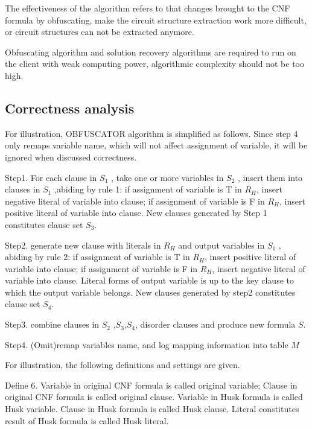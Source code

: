 \documentclass[runningheads,a4paper]{llncs}
\begin{document}
The effectiveness of the algorithm refers to that changes brought to the CNF formula by obfuscating, make the circuit structure extraction work more difficult, 
or circuit structures can not be extracted anymore. 

Obfuscating algorithm and solution recovery algorithms are required to run on the client with weak computing power, algorithmic complexity should not be too high.
\subsection{Correctness analysis}

For illustration, OBFUSCATOR algorithm is simplified as follows. Since step 4 only remaps variable name, which will not affect assignment of variable, 
it will be ignored when discussed correctness.

Step1. For each clause in $S_1$  , take one or more variables in $S_2$ , insert them into clauses in $S_1$ ,abiding by rule 1:
if assignment of variable is T in $R_H$, insert negative literal of variable into clause;
if assignment of variable is F in $R_H$, insert positive literal of variable into clause. 
New clauses generated by Step 1 constitutes clause set $S_3$.

Step2. generate new clause with literals in $R_H$ and output variables in $S_1$ , abiding by rule 2: 
if assignment of variable is T in $R_H$, insert positive literal of variable into clause;
if assignment of variable is F in $R_H$, insert negative literal of variable into clause.
Literal forms of output variable is up to the key clause to which the output variable belongs. 
New clauses generated by step2 constitutes clause set $S_4$.

Step3. combine clauses in $S_2$ ,$S_3$,$S_4$, disorder clauses and produce new formula $S$.

Step4. (Omit)remap variables name, and log mapping information into table $M$ 

For illustration, the following definitions and settings are given.

\noindent Define 6. Variable in original CNF formula is called original variable; Clause in original CNF formula is called original clause. 
Variable in Husk formula is called Husk variable. Clause in Husk formula is called Husk clause. Literal constitutes result of Husk formula is called Husk literal.
\end{document}
